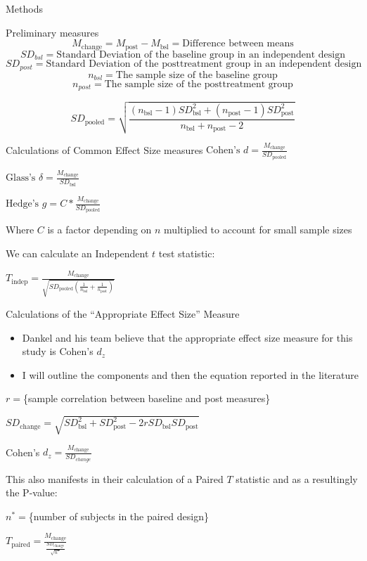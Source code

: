 \documentclass[
  ignorenonframetext,
  aspectratio=169,
]{beamer}
\providecommand{\tightlist}{%
  \setlength{\itemsep}{0pt}\setlength{\parskip}{0pt}}
\begin{document}
\begin{frame}{Methods}
\protect\hypertarget{methods}{}
\begin{block}{Preliminary measures}
\protect\hypertarget{preliminary-measures}{}
\[
M_{\text{change}}=M_{\text{post}}-M_{\text{bsl}}=\text{Difference between means}
\] \[
SD_{bsl}={\text{Standard Deviation of the baseline group in an independent design}}
\] \[
SD_{post}={\text{Standard Deviation of the posttreatment group in an independent design}}
\] \[
n_{bsl}= \text{The sample size of the baseline group}
\] \[
n_{post}= \text{The sample size of the posttreatment group}
\]

\[
SD_\text{pooled}=\sqrt{\frac{(n_{\text{bsl}}-1)SD_{\text{bsl}}^2+(n_{\text{post}}-1)SD^2_{\text{post}}}{
n_{\text{bsl}}+n_{\text{post}}-2}}
\]
\end{block}
\end{frame}

\begin{frame}{Calculations of Common Effect Size measures}
\protect\hypertarget{calculations-of-common-effect-size-measures}{}
\(\text{Cohen's } d= \frac{M_\text{change}}{SD_\text{pooled}}\)

\(\text{Glass's } \delta = \frac{M_\text{change}}{SD_{\text{bsl}}}\)

\(\text{Hedge's }g= C*\frac{M_\text{change}}{SD_\text{pooled}}\)

Where \(C\) is a factor depending on \(n\) multiplied to account for
small sample sizes

We can calculate an Independent \(t\) test statistic:

\(T_\text{indep}= \frac{M_{\text{change}}}{\sqrt{SD_{\text{pooled}}(\frac{1}{n_\text{bsl}}+\frac{1}{n_{\text{post}}})}}\)
\end{frame}

\begin{frame}{Calculations of the ``Appropriate Effect Size'' Measure}
\protect\hypertarget{calculations-of-the-appropriate-effect-size-measure}{}
\begin{itemize}
\tightlist
\item
  Dankel and his team believe that the appropriate effect size measure
  for this study is Cohen's \(d_z\)
\item
  I will outline the components and then the equation reported in the
  literature
\end{itemize}

\(r =\)\{sample correlation between baseline and post measures\}

\(SD_\text{change}=\sqrt{SD_{\text{bsl}}^2+SD_{\text{post}}^2-2rSD_{\text{bsl}}SD_{\text{post}}}\)

Cohen's \(d_{z}= \frac{M_\text{change}}{SD_{change}}\)

This also manifests in their calculation of a Paired \(T\) statistic and
as a resultingly the P-value:

\(n^*=\)\{number of subjects in the paired design\}

\(T_{\text{paired}}=\frac{M_{\text{change}}}{\frac{SD_{\text{change}}}{\sqrt{n^*}}}\)
\end{frame}
\end{document}
